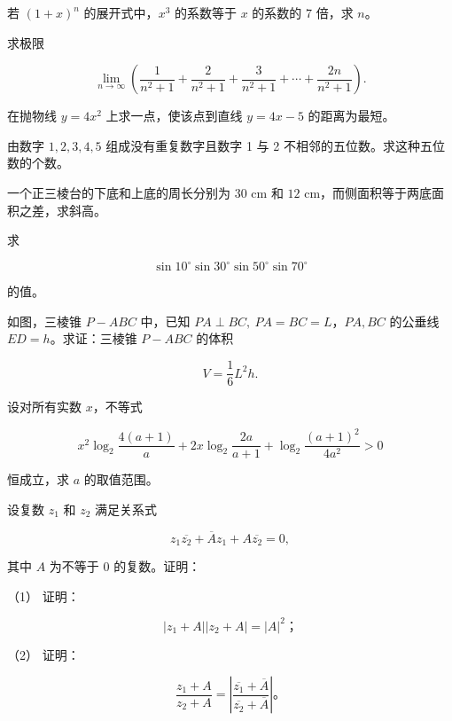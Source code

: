 \begin{question}
若 $(1+x)^n$ 的展开式中，$x^3$ 的系数等于 $x$ 的系数的 7 倍，求 $n$。

\end{question}
\begin{question}
求极限

\nopagebreak[4]
\[
\lim_{n\to\infty}\left(
\frac1{n^2+1}+\frac2{n^2+1}+\frac3{n^2+1}
+\cdots+\frac{2n}{n^2+1}
\right).
\]

\end{question}
\begin{question}
在抛物线 $y=4x^2$ 上求一点，使该点到直线 $y=4x-5$ 的距离为最短。

\end{question}
\begin{question}
由数字 $1,2,3,4,5$ 组成没有重复数字且数字 1 与 2 不相邻的五位数。求这种五位数的个数。

\end{question}
\begin{question}
一个正三棱台的下底和上底的周长分别为 $30\text{ cm}$ 和 $12\text{ cm}$，而侧面积等于两底面积之差，求斜高。

\end{question}
\begin{question}
求

\nopagebreak[4]
\[
\sin10^\circ\sin30^\circ\sin50^\circ\sin70^\circ
\]

的值。

\Needspace{0.4\textheight}
\end{question}
\begin{question}
如图，三棱锥 $P-ABC$ 中，已知 $PA\perp BC,\ PA=BC=L$，$PA,BC$ 的公垂线 $ED=h$。求证：三棱锥 $P-ABC$ 的体积

\nopagebreak[4]
\[
V=\frac16L^2h.
\]
\nopagebreak[4]
\begin{center}\end{center}
\nopagebreak[4]
\end{question}
\begin{question}
设对所有实数 $x$，不等式

\nopagebreak[4]
\[
x^2\log_2\frac{4(a+1)}a
+2x\log_2\frac{2a}{a+1}
+\log_2\frac{(a+1)^2}{4a^2}>0
\]

恒成立，求 $a$ 的取值范围。

\end{question}
\begin{question}
设复数 $z_1$ 和 $z_2$ 满足关系式

\nopagebreak[4]
\[
z_1\overline{z_2}+\overline A z_1+A\overline{z_2}=0,
\]

其中 $A$ 为不等于 0 的复数。证明：

（1） 证明：

\nopagebreak[4]
\[
|z_1+A||z_2+A|=|A|^2\text{；}
\]

（2） 证明：

\nopagebreak[4]
\[
\frac{z_1+A}{z_2+A}
=\left|
\frac{\overline{z_1}+\overline A}
{\overline{z_2}+\overline A}
\right|\text{。}
\]

\end{question}
